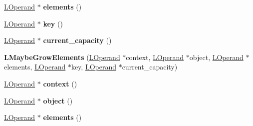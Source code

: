 \begin{DoxyCompactItemize}
\item 
\hyperlink{classv8_1_1internal_1_1_l_operand}{L\+Operand} $\ast$ {\bfseries elements} ()\hypertarget{classv8_1_1internal_1_1_l_maybe_grow_elements_aa58e07c5ac443be8021a0a6dbfe237cb}{}\label{classv8_1_1internal_1_1_l_maybe_grow_elements_aa58e07c5ac443be8021a0a6dbfe237cb}

\item 
\hyperlink{classv8_1_1internal_1_1_l_operand}{L\+Operand} $\ast$ {\bfseries key} ()\hypertarget{classv8_1_1internal_1_1_l_maybe_grow_elements_ac0b59ca4db13f2a31428c9b8063321dc}{}\label{classv8_1_1internal_1_1_l_maybe_grow_elements_ac0b59ca4db13f2a31428c9b8063321dc}

\item 
\hyperlink{classv8_1_1internal_1_1_l_operand}{L\+Operand} $\ast$ {\bfseries current\+\_\+capacity} ()\hypertarget{classv8_1_1internal_1_1_l_maybe_grow_elements_a8fc52ebb7ecf6d10f977d9b56cfe702d}{}\label{classv8_1_1internal_1_1_l_maybe_grow_elements_a8fc52ebb7ecf6d10f977d9b56cfe702d}

\item 
{\bfseries L\+Maybe\+Grow\+Elements} (\hyperlink{classv8_1_1internal_1_1_l_operand}{L\+Operand} $\ast$context, \hyperlink{classv8_1_1internal_1_1_l_operand}{L\+Operand} $\ast$object, \hyperlink{classv8_1_1internal_1_1_l_operand}{L\+Operand} $\ast$elements, \hyperlink{classv8_1_1internal_1_1_l_operand}{L\+Operand} $\ast$key, \hyperlink{classv8_1_1internal_1_1_l_operand}{L\+Operand} $\ast$current\+\_\+capacity)\hypertarget{classv8_1_1internal_1_1_l_maybe_grow_elements_aae48ee99b99d58f8e16bc264666c78ff}{}\label{classv8_1_1internal_1_1_l_maybe_grow_elements_aae48ee99b99d58f8e16bc264666c78ff}

\item 
\hyperlink{classv8_1_1internal_1_1_l_operand}{L\+Operand} $\ast$ {\bfseries context} ()\hypertarget{classv8_1_1internal_1_1_l_maybe_grow_elements_a6af5b70c66f542bb308ac9ada8cb6372}{}\label{classv8_1_1internal_1_1_l_maybe_grow_elements_a6af5b70c66f542bb308ac9ada8cb6372}

\item 
\hyperlink{classv8_1_1internal_1_1_l_operand}{L\+Operand} $\ast$ {\bfseries object} ()\hypertarget{classv8_1_1internal_1_1_l_maybe_grow_elements_a557ff494aa6f7b9a2a5f218005419b34}{}\label{classv8_1_1internal_1_1_l_maybe_grow_elements_a557ff494aa6f7b9a2a5f218005419b34}

\item 
\hyperlink{classv8_1_1internal_1_1_l_operand}{L\+Operand} $\ast$ {\bfseries elements} ()\hypertarget{classv8_1_1internal_1_1_l_maybe_grow_elements_aa58e07c5ac443be8021a0a6dbfe237cb}{}\label{classv8_1_1internal_1_1_l_maybe_grow_elements_aa58e07c5ac443be8021a0a6dbfe237cb}


\end{DoxyCompactItemize}

